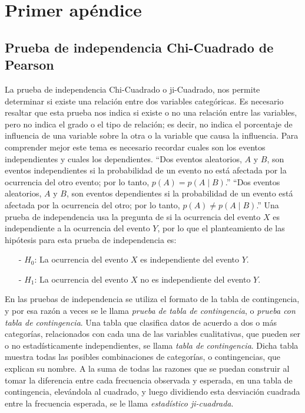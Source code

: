 \appendix
\chapter{Primer apéndice}
\section{Prueba de independencia Chi-Cuadrado de Pearson}
La prueba de independencia Chi-Cuadrado o ji-Cuadrado, nos permite determinar si existe una relación entre dos variables categóricas. Es necesario resaltar que esta prueba nos indica si existe o no una relación entre las variables, pero no indica el grado o el tipo de relación; es decir, no indica el porcentaje de influencia de una variable sobre la otra o la variable que causa la influencia.
\vskip 0.5cm
Para comprender mejor este tema es necesario recordar cuales son los eventos independientes y cuales los dependientes.
\vskip 0.5cm
“Dos eventos aleatorios, $A$ y $B$, son eventos independientes si la probabilidad de un evento no está afectada por la ocurrencia del otro evento; por lo tanto, $p(A) = p(A \mid B)$.”
\vskip 0.5cm
“Dos eventos aleatorios, $A$ y $B$, son eventos dependientes si la probabilidad de un evento está afectada por la ocurrencia del otro; por lo tanto, $p(A) \neq p(A \mid B)$.”
\vskip 0.5cm
Una prueba de independencia usa la pregunta de si la ocurrencia del evento $X$ es independiente a la ocurrencia del evento $Y$, por lo que el planteamiento de las hipótesis para esta prueba de independencia es:
\begin{enumerate}
\item[-]$H_{0}$: La ocurrencia del evento $X$ es independiente del evento $Y$.
\item[-]$H_{1}$: La ocurrencia del evento $X$ no es independiente del evento $Y$.
\end{enumerate}
En las pruebas de independencia se utiliza el formato de la tabla de contingencia, y por esa razón a veces se le llama \textit{prueba de tabla de contingencia}, o \textit{prueba con tabla de contingencia}.
\vskip 0.5cm
Una tabla que clasifica datos de acuerdo a dos o más categorías, relacionados con cada una de las variables cualitativas, que pueden ser o no estadísticamente independientes, se llama \textit{tabla de contingencia}. Dicha tabla muestra todas las posibles combinaciones de categorías, o contingencias, que explican su nombre.
\vskip 0.5cm
A la suma de todas las razones que se puedan construir al tomar la diferencia entre cada frecuencia observada y esperada, en una tabla de contingencia, elevándola al cuadrado, y luego dividiendo esta desviación cuadrada entre la frecuencia esperada, se le llama \textit{estadístico ji-cuadrada}.
